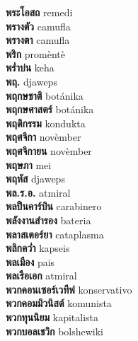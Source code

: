 \textbf{ พระโอสถ  } remedi \\
\textbf{ พรางตัว  } camufla \\
\textbf{ พรางตา  } camufla \\
\textbf{ พริก  } promèntè \\
\textbf{ พร่ำบ่น  } keha \\
\textbf{ พฤ.  } djaweps \\
\textbf{ พฤกษชาติ  } botánika \\
\textbf{ พฤกษศาสตร์  } botánika \\
\textbf{ พฤติกรรม  } kondukta \\
\textbf{ พฤศจิกา  } novèmber \\
\textbf{ พฤศจิกายน  } novèmber \\
\textbf{ พฤษภา  } mei \\
\textbf{ พฤหัส  } djaweps \\
\textbf{ พล.ร.อ.  } atmiral \\
\textbf{ พลปืนคาร์บิน  } carabinero \\
\textbf{ พลังงานสำรอง  } bateria \\
\textbf{ พลาสเตอร์ยา  } cataplasma \\
\textbf{ พลิกคว่ำ  } kapseis \\
\textbf{ พลเมือง  } pais \\
\textbf{ พลเรือเอก  } atmiral \\
\textbf{ พวกคอนเซอร์เวทีฟ  } konservativo \\
\textbf{ พวกคอมมิวนิสต์  } komunista \\
\textbf{ พวกทุนนิยม  } kapitalista \\
\textbf{ พวกบอลเชวิก  } bolshewiki \\
